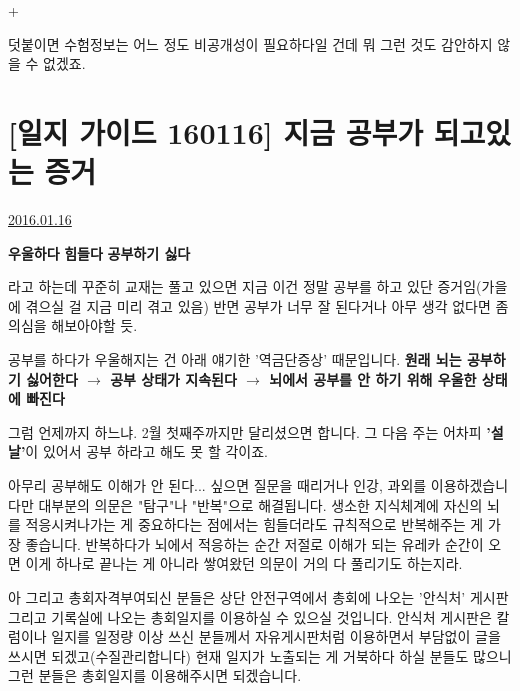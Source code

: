 +
\vspace{5mm}

덧붙이면 수험정보는 어느 정도 비공개성이 필요하다일 건데 뭐 그런 것도 감안하지 않을 수 없겠죠.
\vspace{5mm}










\section{[일지 가이드 160116] 지금 공부가 되고있는 증거}
\href{https://www.kockoc.com/Apoc/590446}{2016.01.16}

\vspace{5mm}

\textbf{우울하다}
\textbf{힘들다}
\textbf{공부하기 싫다}
\vspace{5mm}

라고 하는데 꾸준히 교재는 풀고 있으면 지금 이건 정말 공부를 하고 있단 증거임(가을에 겪으실 걸 지금 미리 겪고 있음)
반면 공부가 너무 잘 된다거나 아무 생각 없다면 좀 의심을 해보아야할 듯.
\vspace{5mm}

공부를 하다가 우울해지는 건 아래 얘기한 '역금단증상' 때문입니다.
\textbf{원래 뇌는 공부하기 싫어한다 $\rightarrow$ 공부 상태가 지속된다 $\rightarrow$ 뇌에서 공부를 안 하기 위해 우울한 상태에 빠진다}
\vspace{5mm}

그럼 언제까지 하느냐. 2월 첫째주까지만 달리셨으면 합니다.
그 다음 주는 어차피 \textbf{'설날'}이 있어서 공부 하라고 해도 못 할 각이죠.
\vspace{5mm}

아무리 공부해도 이해가 안 된다... 싶으면 질문을 때리거나 인강, 과외를 이용하겠습니다만
대부분의 의문은 "탐구"나 "반복"으로 해결됩니다.
생소한 지식체계에 자신의 뇌를 적응시켜나가는 게 중요하다는 점에서는 힘들더라도 규칙적으로 반복해주는 게 가장 좋습니다.
반복하다가 뇌에서 적응하는 순간 저절로 이해가 되는 유레카 순간이 오면 이게 하나로 끝나는 게 아니라 쌓여왔던 의문이 거의 다 풀리기도 하는지라.
\vspace{5mm}

아 그리고 총회자격부여되신 분들은 상단 안전구역에서 총회에 나오는 '안식처' 게시판
그리고 기록실에 나오는 총회일지를 이용하실 수 있으실 것입니다.
안식처 게시판은 칼럼이나 일지를 일정량 이상 쓰신 분들께서 자유게시판처럼 이용하면서 부담없이 글을 쓰시면 되겠고(수질관리합니다)
현재 일지가 노출되는 게 거북하다 하실 분들도 많으니 그런 분들은 총회일지를 이용해주시면 되겠습니다.
\vspace{5mm}



